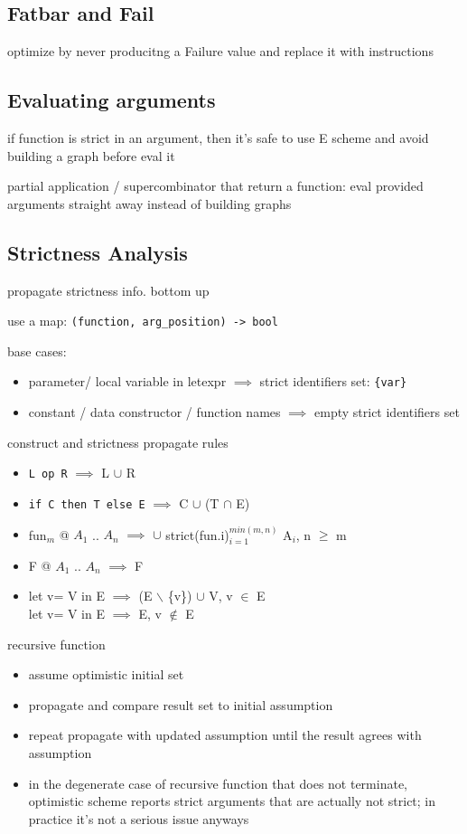 \documentclass[8pt]{extarticle}
\begin{document}
\begin{multicols*}{2}
\subsection{Fatbar and Fail}
optimize by never producitng a Failure value and replace it with instructions

\subsection{Evaluating arguments}

if function is strict in an argument, then it's safe to use E scheme and avoid building a graph before eval it

partial application / supercombinator that return a function: eval provided arguments straight away instead of building graphs

\subsection{Strictness Analysis}
propagate strictness info. bottom up

use a map: \verb|(function, arg_position) -> bool|

base cases:
\begin{itemize}
\item parameter/ local variable in letexpr $\implies$ strict identifiers set: \verb|{var}|
\item constant / data constructor / function names $\implies$ empty strict identifiers set
\end{itemize}

construct and strictness propagate rules
\begin{itemize}
\item \verb|L op R| $\implies$ L $\cup$ R
\item \verb|if C then T else E| $\implies$ C $\cup$ (T $\cap$ E)
\item fun$_m$ @ $A_1$ .. $A_n$ $\implies$ $\cup$ strict(fun.i)$_{i=1}^{min(m,n)}$ A$_i$, n $\geq$ m
\item F @ $A_1$ .. $A_n$ $\implies$ F
\item let v= V in E $\implies$ (E $\backslash$ \{v\}) $\cup$ V, v $\in$ E\\
  let v= V in E $\implies$ E, v $\not\in$ E
\end{itemize}

recursive function
\begin{itemize}
\item assume optimistic initial set
\item propagate and compare result set to initial assumption
\item repeat propagate with updated assumption until the result agrees with assumption
\item in the degenerate case of recursive function that does not terminate, optimistic scheme reports strict arguments that are actually not strict; in practice it's not a serious issue anyways
\end{itemize}


\end{multicols*}
\end{document}
